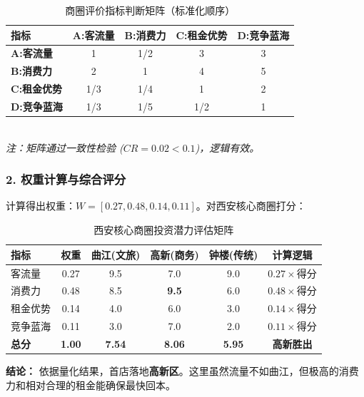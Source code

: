 \documentclass{cumcmthesis}
\begin{document}
\begin{table}[H]
    \centering
    \caption{商圈评价指标判断矩阵（标准化顺序）}
    \begin{tabular}{l | c c c c}
        \toprule
        \textbf{指标} & \textbf{A:客流量} & \textbf{B:消费力} & \textbf{C:租金优势} & \textbf{D:竞争蓝海} \\
        \midrule
        \textbf{A:客流量}   & 1 & 1/2 & 3 & 3 \\
        \textbf{B:消费力}   & 2 & 1 & 4 & 5 \\
        \textbf{C:租金优势} & 1/3 & 1/4 & 1 & 2 \\
        \textbf{D:竞争蓝海} & 1/3 & 1/5 & 1/2 & 1 \\
        \bottomrule
    \end{tabular}
    \\[5pt]
    \footnotesize{\textit{注：矩阵通过一致性检验 ($CR=0.02 < 0.1$)，逻辑有效。}}
\end{table}

\subsubsection{2. 权重计算与综合评分}
计算得出权重：$W=[0.27, 0.48, 0.14, 0.11]$。对西安核心商圈打分：

\begin{table}[H]
    \centering
    \caption{西安核心商圈投资潜力评估矩阵}
    \begin{tabular}{l c c c c c}
        \toprule
        \textbf{指标} & \textbf{权重} & \textbf{曲江(文旅)} & \textbf{高新(商务)} & \textbf{钟楼(传统)} & \textbf{计算逻辑} \\
        \midrule
        客流量 & 0.27 & 9.5 & 7.0 & 9.0 & $0.27 \times \text{得分}$ \\
        消费力 & 0.48 & 8.5 & \textbf{9.5} & 6.0 & $0.48 \times \text{得分}$ \\
        租金优势 & 0.14 & 4.0 & 6.0 & 3.0 & $0.14 \times \text{得分}$ \\
        竞争蓝海 & 0.11 & 3.0 & 7.0 & 2.0 & $0.11 \times \text{得分}$ \\
        \midrule
        \textbf{总分} & \textbf{1.00} & \textbf{7.54} & \textbf{8.06} & \textbf{5.95} & \textbf{高新胜出} \\
        \bottomrule
    \end{tabular}
\end{table}

\textbf{结论：} 依据量化结果，首店落地\textbf{高新区}。这里虽然流量不如曲江，但极高的消费力和相对合理的租金能确保最快回本。
\end{document}
